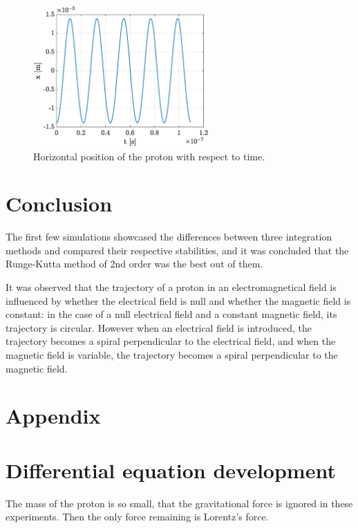 \documentclass[a4paper,12pt,twoside]{article}
\begin{document}
\begin{figure}
\centering
	\includegraphics[width=0.6\textwidth]{graphs/app2_x.eps}
	\caption{Horizontal position of the proton with respect to time.}
	\label{fig:app2-position}
\end{figure}

\section{Conclusion}
The first few simulations showcased the differences between three integration methods and compared their respective stabilities, and it was concluded that the Runge-Kutta method of 2nd order was the best out of them.

It was observed that the trajectory of a proton in an electromagnetical field is influenced by whether the electrical field is null and whether the magnetic field is constant: in the case of a null electrical field and a constant magnetic field, its trajectory is circular. However when an electrical field is introduced, the trajectory becomes a spiral perpendicular to the electrical field, and when the magnetic field is variable, the trajectory becomes a spiral perpendicular to the magnetic field.

\appendix
\section*{Appendix}

\section{Differential equation development} \label{ann:dev-eq-diff}
The mass of the proton is so small, that the gravitational force is ignored in these experiments.
Then the only force remaining is Lorentz's force.
\end{document}
